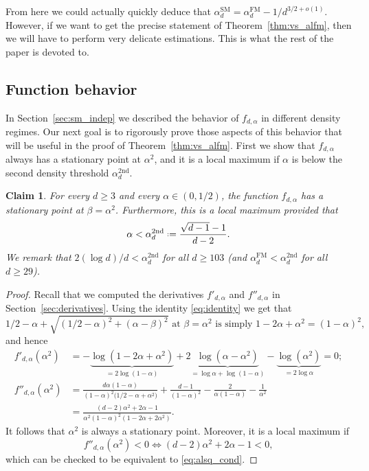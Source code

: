 \documentclass[12pt]{amsart}
\newtheorem{claim}[theorem]{Claim}
\theoremstyle{definition}
\newcommand\al{\alpha}
\newcommand\be{\beta}
\newcommand\alfm{\alpha^{\mathrm{FM}}}
\newcommand\alsm{\alpha^{\mathrm{SM}}}
\newcommand{\defeq}{\mathrel{\vcenter{\baselineskip0.5ex \lineskiplimit0pt
                     \hbox{\scriptsize.}\hbox{\scriptsize.}}}%
                     =}
\begin{document}
From here we could actually quickly deduce that $\alsm_d = \alfm_d - 1/d^{3/2+o(1)}$. However, if we want to get the precise statement of Theorem~\ref{thm:vs_alfm}, then we will have to perform very delicate estimations. This is what the rest of the paper is devoted to.


\subsection{Function behavior} \label{sec:behavior}
%
In Section~\ref{sec:sm_indep} we described the behavior of $f_{d,\al}$ in different density regimes. Our next goal is to rigorously prove those aspects of this behavior that will be useful in the proof of Theorem~\ref{thm:vs_alfm}. First we show that $f_{d,\al}$ always has a stationary point at $\al^2$, and it is a local maximum if $\al$ is below the second density threshold $\al_d^{\textrm{2nd}}$. 
%
\begin{claim} \label{cl:al_sq}
For every $d \geq 3$ and every $\al \in (0,1/2)$, the function $f_{d,\al}$ has a stationary point at $\be=\al^2$. Furthermore, this is a local maximum provided that  
%
\begin{equation} \label{eq:alsq_cond}
\al < \al_d^{\textrm{2nd}} \defeq \frac{\sqrt{d-1}-1}{d-2} .
\end{equation}
%
We remark that $2(\log d)/d<\al_d^{\textrm{2nd}}$ for all $d \geq 103$ (and $\alfm_d < \al_d^{\textrm{2nd}}$ for all $d \geq 29$).
\end{claim}
%
\begin{proof}
Recall that we computed the derivatives $f'_{d,\al}$ and $f''_{d,\al}$ in Section~\ref{sec:derivatives}. Using the identity \eqref{eq:identity} we get that 
\[ 1/2-\al +\sqrt{(1/2-\al)^2+(\al-\be)^2} \text{ at } \be=\al^2 \text{ is simply } 1-2\al+\al^2=(1-\al)^2 ,\] 
and hence 
%
\begin{align*}
f'_{d,\al}(\al^2) &= -
\underbrace{\log( 1-2\al + \al^2 )}_{=2\log(1-\al)} 
+ 2 \underbrace{\log(\al-\al^2)}_{=\log \al + \log(1-\al)} - \underbrace{\log(\al^2)}_{=2\log \al}
= 0 ;\\
f''_{d,\al}(\al^2) &=  
\frac{d\al(1-\al)}{(1-\al)^2 \big( 1/2 - \al + \al^2 \big)}
+\frac{d-1}{(1-\al)^2}
-\frac{2}{\al(1-\al)}
-\frac{1}{\al^2} \\
&= \frac{(d-2)\al^2 + 2\al -1}
{\al^2(1-\al)^2(1-2\al+2\al^2)}.
\end{align*}
%
It follows that $\al^2$ is always a stationary point. Moreover, it is a local maximum if 
%
\[ f''_{d,\al}(\al^2)<0 \Leftrightarrow
(d-2)\al^2 + 2\al -1 < 0 ,\]
%
which can be checked to be equivalent to \eqref{eq:alsq_cond}.
\end{proof}
%
\end{document}
